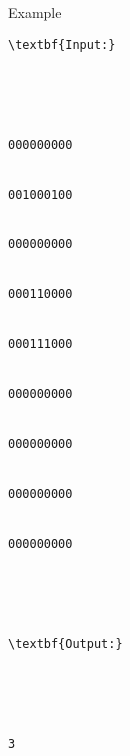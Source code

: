 Example
\begin{verbatim}
\textbf{Input:}





000000000 


001000100 


000000000 


000110000 


000111000 


000000000 


000000000 


000000000 


000000000 





\textbf{Output:}





3


\end{verbatim}